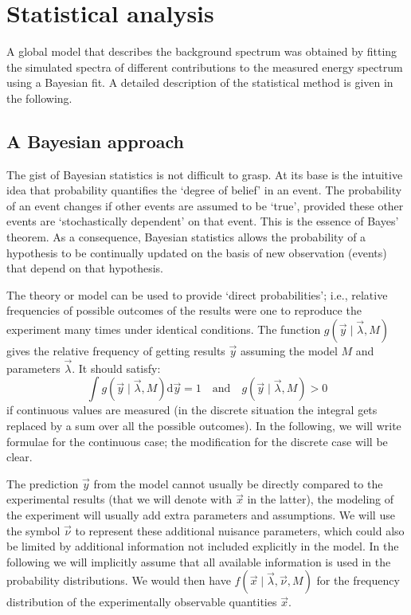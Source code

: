 \section{Statistical analysis}\label{sec:bayes}
A global model that describes the background spectrum was obtained by fitting the simulated spectra of different contributions to the measured energy spectrum using a Bayesian fit. A detailed description of the statistical method is given in the following.
\subsection*{A Bayesian approach}
The gist of Bayesian statistics is not difficult to grasp. At its base is the intuitive idea that probability quantifies the `degree of belief' in an event. The probability of an event changes if other events are assumed to be `true', provided these other events are `stochastically dependent' on that event. This is the essence of Bayes' theorem. As a consequence, Bayesian statistics allows the probability of a hypothesis to be continually updated on the basis of new observation (events) that depend on that hypothesis. 

 The theory or model can be used to provide `direct probabilities'; i.e., relative frequencies of possible outcomes of the results were one to reproduce the experiment many times under identical conditions. The function $g(\vec{y}\mid\vec{\lambda},M)$ gives the relative frequency of getting results $\vec{y}$ assuming the model $M$ and parameters $\vec{\lambda}$. It should satisfy:
\begin{equation}\int g(\vec{y}\mid\vec{\lambda},M)\text{d}\vec{y}=1 \quad\text{and}\quad g(\vec{y}\mid\vec{\lambda},M)>0\end{equation}
if continuous values are measured (in the discrete situation the integral gets replaced by a sum over all the possible outcomes). In the following, we will write formulae for the continuous case; the modification for the discrete case will be clear.

The prediction $\vec{y}$ from the model cannot usually be directly compared to the experimental results (that we will denote with $\vec{x}$ in the latter), the modeling of the experiment will usually add extra parameters and assumptions. We will use the symbol $\vec{\nu}$ to represent these additional nuisance parameters, which could also be limited by additional information not included explicitly in the model. In the following we will implicitly assume that all available information is used in the probability distributions. We would then have $f(\vec{x}\mid\vec{\lambda},\vec{\nu},M)$ for the frequency distribution of the experimentally observable quantities $\vec{x}$.

